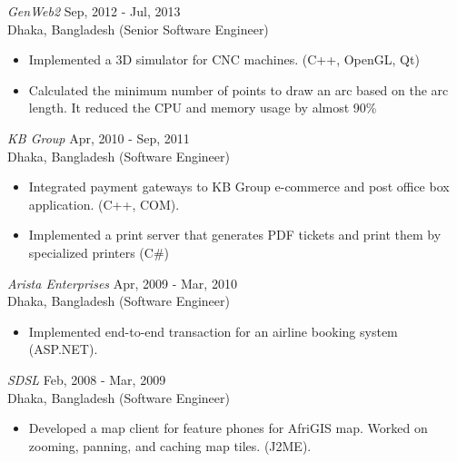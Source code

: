 \documentclass{res}
\begin{document}
\begin{resume}
{\sl GenWeb2}       \hfill               Sep, 2012 - Jul, 2013 \\
Dhaka, Bangladesh \hfill   (Senior Software Engineer)
\begin{itemize} \itemsep -2pt
	\item  Implemented a 3D simulator for CNC machines. (C++, OpenGL, Qt) 
	\item  Calculated the minimum number of points to draw an arc based on the arc length. It reduced the CPU and memory usage by almost 90\%
\end{itemize} \vspace{-6pt}
 
{\sl KB Group}       \hfill               Apr, 2010 - Sep, 2011 \\
Dhaka, Bangladesh \hfill   (Software Engineer)
 \begin{itemize}
 \item  Integrated payment gateways to KB Group e-commerce and post office box application. (C++, COM). 
 \item  Implemented a print server that generates PDF tickets and print them by specialized printers (C\#)
 \end{itemize} 
 
{\sl Arista Enterprises} \hfill  Apr, 2009 - Mar, 2010 \\
Dhaka, Bangladesh \hfill   (Software Engineer)
\begin{itemize} 
\item  Implemented end-to-end transaction for an airline booking system (ASP.NET). 
\end{itemize}  

{\sl SDSL} \hfill                  Feb, 2008 - Mar, 2009 \\
Dhaka, Bangladesh \hfill   (Software Engineer)
\begin{itemize}
\item Developed a map client for feature phones for AfriGIS map. Worked on zooming, panning, and caching map tiles. (J2ME). 
\end{itemize} 
 
\vspace{0.01in} 

\end{resume}
\end{document}
